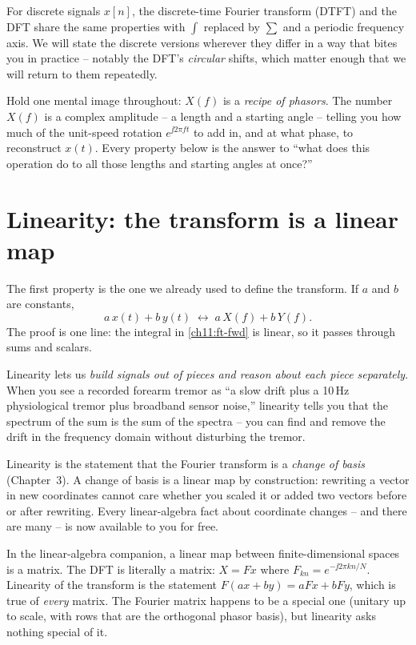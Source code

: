 For discrete signals $x[n]$, the discrete-time Fourier transform (DTFT) and the
DFT share the same properties with $\int$ replaced by $\sum$ and a periodic
frequency axis. We will state the discrete versions wherever they differ in a way
that bites you in practice -- notably the DFT's \emph{circular} shifts, which matter
enough that we will return to them repeatedly.

\begin{intuitionbox}
Hold one mental image throughout: $X(f)$ is a \emph{recipe of phasors}. The
number $X(f)$ is a complex amplitude -- a length and a starting angle -- telling
you how much of the unit-speed rotation $e^{\jj 2\pi f t}$ to add in, and at what
phase, to reconstruct $x(t)$. Every property below is the answer to ``what does
this operation do to all those lengths and starting angles at once?''
\end{intuitionbox}

\section{Linearity: the transform is a linear map}
\label{ch11:linearity}

The first property is the one we already used to define the transform. If $a$ and $b$ are constants,
\[
a\,x(t) + b\,y(t) \;\longleftrightarrow\; a\,X(f) + b\,Y(f).
\]
The proof is one line: the integral in \eqref{ch11:ft-fwd} is linear, so it passes through sums and scalars.

Linearity lets us \emph{build
signals out of pieces and reason about each piece separately}. When you see a
recorded forearm tremor as ``a slow drift plus a 10\,Hz physiological tremor
plus broadband sensor noise,'' linearity tells you that the
spectrum of the sum is the sum of the spectra -- you can find and remove the
drift in the frequency domain without disturbing the tremor.

\begin{whybox}
Linearity is the statement that the Fourier transform is a \emph{change
of basis} (Chapter~3). A change of basis is a linear map by
construction: rewriting a vector in new coordinates cannot care whether you
scaled it or added two vectors before or after rewriting. Every linear-algebra
fact about coordinate changes -- and there are many -- is now available to you
for free.
\end{whybox}

\begin{connectionbox}
In the linear-algebra companion, a linear map between finite-dimensional spaces
is a matrix. The DFT is literally a matrix: $X = F x$ where $F_{kn} =
e^{-\jj 2\pi kn/N}$. Linearity of the transform is the statement
$F(ax+by) = aFx + bFy$, which is true of \emph{every} matrix. The Fourier
matrix happens to be a special one (unitary up to scale, with rows that are
the orthogonal phasor basis), but linearity asks nothing special of it.
\end{connectionbox}

